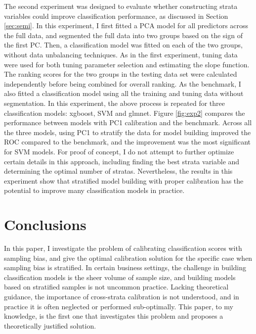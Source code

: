 \documentclass{article} %
\begin{document}
The second experiment was designed to evaluate whether constructing strata variables could improve classification performance, as discussed in Section \ref{sec:semi}. In this experiment, I first fitted a PCA model for all predictors across the full data, and segmented the full data into two groups based on the sign of the first PC. Then, a classification model was fitted on each of the two groups, without data unbalancing techniques. As in the first experiment, tuning data were used for both tuning parameter selection and estimating the slope function. The ranking scores for the two groups in the testing data set were calculated independently before being combined for overall ranking. As the benchmark, I also fitted a classification model using all the training and tuning data without segmentation. In this experiment, the above process is repeated for three classification models: xgboost, SVM and glmnet. Figure \ref{fig:exp2} compares the performance between models with PC1 calibration and the benchmark. Across all the three models, using PC1 to stratify the data for model building improved the ROC compared to the benchmark, and the improvement was the most significant for SVM models. For proof of concept, I do not attempt to further optimize certain details in this approach, including finding the best strata variable and determining the optimal number of stratas. Nevertheless, the results in this experiment show that stratified model building with proper calibration has the potential to improve many classification models in practice.

\section{Conclusions}\label{sec:conclusions}

In this paper, I investigate the problem of calibrating classification scores with sampling bias, and give the optimal calibration solution for the specific case when sampling bias is stratified. In certain business settings, the challenge in building classification models is the sheer volume of sample size, and building models based on stratified samples is not uncommon practice. Lacking theoretical guidance, the importance of cross-strata calibration is not understood, and in practice it is often neglected or performed sub-optimally. This paper, to my knowledge, is the first one that investigates this problem and proposes a theoretically justified solution.
\end{document}
